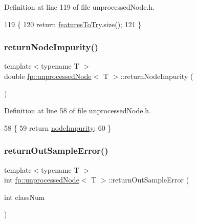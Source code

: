 Definition at line 119 of file unprocessed\+Node.\+h.


\begin{DoxyCode}
119                                                  \{
120                     \textcolor{keywordflow}{return} \hyperlink{classfp_1_1unprocessedNode_a3cffd07402568c03834d0a1248f3a6e3}{featuresToTry}.size();
121                 \}
\end{DoxyCode}
\mbox{\label{classfp_1_1unprocessedNode_af44e7657d88e4a7bc61b22d97267f940}} 
\subsubsection{\texorpdfstring{return\+Node\+Impurity()}{returnNodeImpurity()}}
{\footnotesize\ttfamily template$<$typename T $>$ \\
double \hyperlink{classfp_1_1unprocessedNode}{fp\+::unprocessed\+Node}$<$ T $>$\+::return\+Node\+Impurity (\begin{DoxyParamCaption}{ }\end{DoxyParamCaption})\hspace{0.3cm}{\ttfamily [inline]}}



Definition at line 58 of file unprocessed\+Node.\+h.


\begin{DoxyCode}
58                                                   \{
59                     \textcolor{keywordflow}{return} \hyperlink{classfp_1_1unprocessedNode_a5bb6906b09625f7893bf0ffd512b1714}{nodeImpurity};
60                 \}
\end{DoxyCode}
\mbox{\label{classfp_1_1unprocessedNode_afbeba7b37bd021e36545af60676f05d5}} 
\subsubsection{\texorpdfstring{return\+Out\+Sample\+Error()}{returnOutSampleError()}}
{\footnotesize\ttfamily template$<$typename T $>$ \\
int \hyperlink{classfp_1_1unprocessedNode}{fp\+::unprocessed\+Node}$<$ T $>$\+::return\+Out\+Sample\+Error (\begin{DoxyParamCaption}\item[{int}]{class\+Num }\end{DoxyParamCaption})\hspace{0.3cm}{\ttfamily [inline]}}



